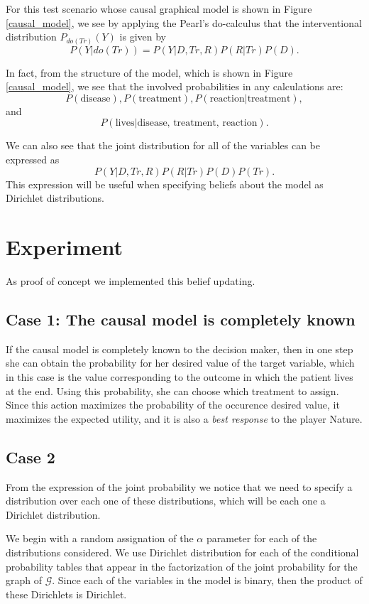 \documentclass{article}
\begin{document}
For this test scenario whose causal graphical model is shown in Figure \ref{causal_model}, we see  by applying the Pearl's do-calculus that the interventional distribution $P_{do(Tr)}(Y)$ is given by
\[ P(Y | do(Tr))=P(Y | D, Tr, R)P(R | Tr) P(D). \]

In fact, from the structure of the model, which is shown in Figure \ref{causal_model}, we see that the involved probabilities in any calculations are:
\[ P(\textrm{disease}), P(\textrm{treatment}), P(\textrm{reaction} | \textrm{treatment}), \]
and
\[P(\textrm{lives} | \textrm{disease, treatment, reaction}). \]

We can also see that the joint distribution for all of the variables can be expressed as
\[ P(Y | D, Tr, R)P(R | Tr) P(D)P(Tr). \]
This expression will be useful when specifying beliefs about the model as Dirichlet distributions.
\section{Experiment}
As proof of concept we implemented this belief updating. 

\subsection{Case 1: The causal model is completely known}
If the causal model is completely known to the decision maker, then in one step she can obtain the probability for her desired value of the target variable, which in this case is the value corresponding to the outcome in which the patient lives at the end. Using this probability, she can choose which treatment to assign. Since this action maximizes the probability of the occurence desired value, it maximizes the expected utility, and it is also a \textit{best response} to the player Nature.

\subsection{Case 2}
From the expression of the joint probability we notice that we need to specify a distribution over each one of these distributions, which will be each one a Dirichlet distribution.

We begin with a random assignation of the $\alpha$ parameter for each of the distributions considered. We use Dirichlet distribution for each of the conditional probability tables that appear in the factorization of the joint probability for the graph of $\mathcal{G}$. Since each of the variables in the model is binary, then the product of these Dirichlets is Dirichlet.
\end{document}
